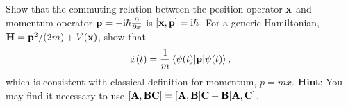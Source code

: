 
\smallskip\subp
Show that the commuting relation between the position operator $\bf x$
and momentum operator ${\bf p} = -{\rm i} \hbar \frac{\partial}{\partial x}$
is ${[{\bf x}, {\bf p}]} = {\rm i} \hbar$.
For a generic Hamiltonian, ${\bf H} = {\bf p}^2 / (2m) + V({\bf x})$,
show that
$$ \dot{x}(t) = \frac{1}{m} \left\langle\psi(t) \lvert {\bf p} \rvert \psi(t)\right\rangle ,$$
which is consistent with classical definition for momentum, $ p = m \dot x$.
{\bf Hint}: You may find it necessary to use
$[{\bf A}, {\bf BC}] = [{\bf A}, {\bf B}]{\bf C} + {\bf B}[{\bf A}, {\bf C}]$.

